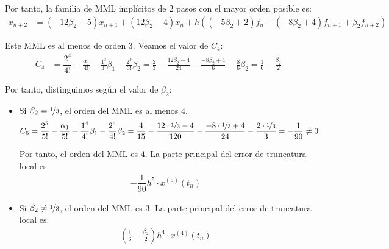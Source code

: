 \begin{ejercicio}
    Por tanto, la familia de MML implícitos de 2 pasos con el mayor orden posible es:
    \begin{align*}
        x_{n+2} &= (-12\beta_2 + 5)x_{n+1} + (12\beta_2 - 4)x_n + h\left((-5\beta_2+2)f_n + (-8\beta_2 + 4)f_{n+1} + \beta_2 f_{n+2}\right)
    \end{align*}

    Este MML es al menos de orden 3. Veamos el valor de $C_4$:
    \begin{align*}
        C_4 &= \dfrac{2^4}{4!} -\frac{\alpha_1}{4!} - \frac{1^3}{3!}\beta_1- \frac{2^3}{3!}\beta_2
        = \frac{2}{3} - \frac{12\beta_2-4}{24} - \frac{-8\beta_2+4}{6} - \frac{8}{6}\beta_2
        = \frac{1}{6} - \frac{\beta_2}{2}
    \end{align*}

    Por tanto, distinguimos según el valor de $\beta_2$:
    \begin{itemize}
        \item Si $\beta_2=\nicefrac{1}{3}$, el orden del MML es al menos $4$.
        \begin{align*}
            C_5 &= \dfrac{2^5}{5!} -\frac{\alpha_1}{5!} - \frac{1^4}{4!}\beta_1- \frac{2^4}{4!}\beta_2
            = \frac{4}{15} - \frac{12\cdot \nicefrac{1}{3}-4}{120} - \frac{-8\cdot \nicefrac{1}{3}+4}{24} - \frac{2\cdot \nicefrac{1}{3}}{3}
            = -\dfrac{1}{90}\neq 0
        \end{align*}

        Por tanto, el orden del MML es $4$. La parte principal del error de truncatura local es:
        \begin{align*}
            -\dfrac{1}{90}h^5\cdot x^{(5)}(t_n)
        \end{align*}
        \item Si $\beta_2\neq \nicefrac{1}{3}$, el orden del MML es $3$. La parte principal del error de truncatura local es:
        \begin{align*}
            \left(\frac{1}{6} - \frac{\beta_2}{2}\right)h^4\cdot x^{(4)}(t_n)
        \end{align*}
    \end{itemize}


\end{ejercicio}
